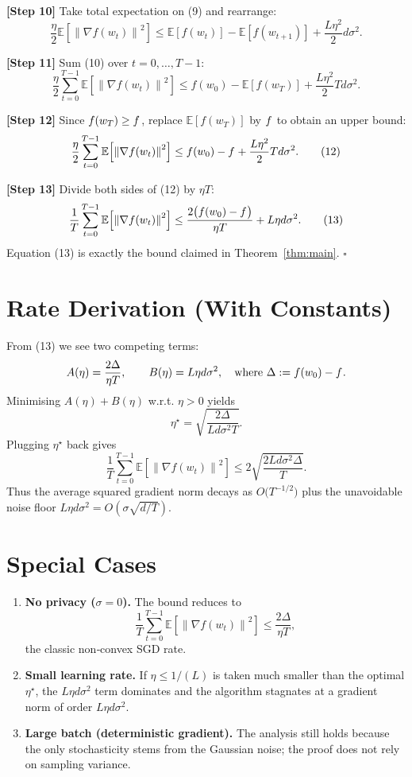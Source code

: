 \documentclass{article}
\newcommand{\EE}{\mathbb{E}}
\newcommand{\norm}[1]{\left\lVert #1\right\rVert}
\begin{document}
\noindent\textbf{[Step 10]} Take total expectation on (9) and rearrange:
\[
\frac{\eta}{2}\EE\!\left[\norm{\nabla f(w_{t})}^{2}\right]
\le \EE\!\left[f(w_{t})\right]-\EE\!\left[f(w_{t+1})\right]
+\frac{L\eta^{2}}{2}d\sigma^{2}.
\tag{10}
\]

\noindent\textbf{[Step 11]} Sum (10) over $t=0,\dots,T-1$:
\[
\frac{\eta}{2}\sum_{t=0}^{T-1}\EE\!\left[\norm{\nabla f(w_{t})}^{2}\right]
\le f(w_{0})-\EE\!\left[f(w_{T})\right]
+ \frac{L\eta^{2}}{2}Td\sigma^{2}.
\tag{11}
\]

\noindent\textbf{[Step 12]} Since $f(w_{T})\ge f^{\*}$, replace $\EE[f(w_{T})]$ by $f^{\*}$ to obtain an upper bound:
\[
\frac{\eta}{2}\sum_{t=0}^{T-1}\EE\!\left[\norm{\nabla f(w_{t})}^{2}\right]
\le f(w_{0})-f^{\*}
+ \frac{L\eta^{2}}{2}Td\sigma^{2}.
\tag{12}
\]

\noindent\textbf{[Step 13]} Divide both sides of (12) by $\eta T$:
\[
\frac{1}{T}\sum_{t=0}^{T-1}\EE\!\left[\norm{\nabla f(w_{t})}^{2}\right]
\le
\frac{2\bigl(f(w_{0})-f^{\*}\bigr)}{\eta T}
+ L\eta d\sigma^{2}.
\tag{13}
\]
Equation (13) is exactly the bound claimed in Theorem~\ref{thm:main}. \hfill $\square$

\section*{Rate Derivation (With Constants)}
From (13) we see two competing terms:
\[
A(\eta)=\frac{2\Delta}{\eta T},\qquad
B(\eta)=L\eta d\sigma^{2},\quad\text{where }\Delta:=f(w_{0})-f^{\*}.
\]
Minimising $A(\eta)+B(\eta)$ w.r.t. $\eta>0$ yields
\[
\eta^{\star}= \sqrt{\frac{2\Delta}{L d\sigma^{2}T}}.
\]
Plugging $\eta^{\star}$ back gives
\[
\frac{1}{T}\sum_{t=0}^{T-1}\EE\!\left[\norm{\nabla f(w_{t})}^{2}\right]
\le 2\sqrt{\frac{2L d\sigma^{2}\Delta}{T}}.
\]
Thus the average squared gradient norm decays as $O\!\bigl(T^{-1/2}\bigr)$ plus the unavoidable noise floor $L\eta d\sigma^{2}=O(\sigma\sqrt{d/T})$.

\section*{Special Cases}
\begin{enumerate}
\item \textbf{No privacy (}\boldmath$\sigma=0$\textbf{).} The bound reduces to
\[
\frac{1}{T}\sum_{t=0}^{T-1}\EE\!\left[\norm{\nabla f(w_{t})}^{2}\right]\le \frac{2\Delta}{\eta T},
\]
the classic non‑convex SGD rate.
\item \textbf{Small learning rate.} If $\eta\le 1/(L)$ is taken much smaller than the optimal $\eta^{\star}$, the $L\eta d\sigma^{2}$ term dominates and the algorithm stagnates at a gradient norm of order $L\eta d\sigma^{2}$.
\item \textbf{Large batch (deterministic gradient).} The analysis still holds because the only stochasticity stems from the Gaussian noise; the proof does not rely on sampling variance.
\end{enumerate}
\end{document}
